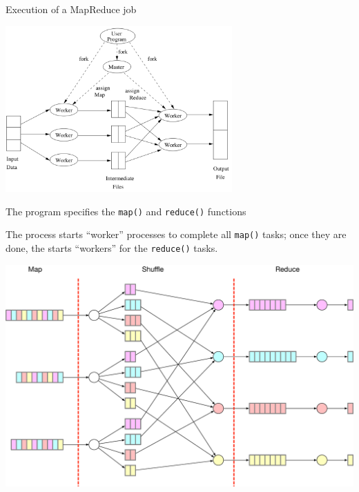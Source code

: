 %
%


\begin{frame}{Execution of a MapReduce job}
\begin{center}
\includegraphics[width=0.65\textwidth]{figures/mapreduce_forking.png}
\end{center}

\vspace*{-1em}

The program specifies the \lstinline{map()} and \lstinline{reduce()} functions 

The  process starts ``worker'' processes to complete all \lstinline{map()} tasks; once they are done, the  starts ``workers'' for the \lstinline{reduce()} tasks.

\end{frame}


%
%


\begin{frame}
\centering\includegraphics[width=\textwidth]{figures/map_reduce_shuffle.eps}
\end{frame}



